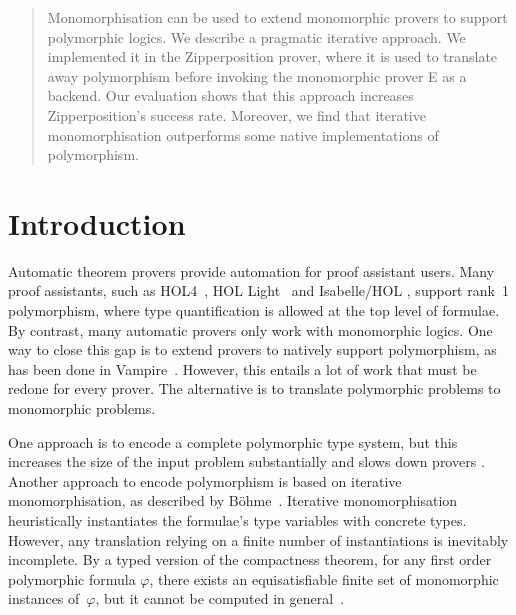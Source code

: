 \documentclass[runningheads]{llncs}
\begin{document}
\author{Tanguy Bozec\textsuperscript{\CORR} \and
Jasmin Blanchette}




\maketitle

\begin{sloppy}
\begin{abstract}
Monomorphisation can be used to extend monomorphic provers to support polymorphic logics. We describe a pragmatic iterative approach. We implemented it in the Zipperposition prover, where it is used to translate away polymorphism before invoking the monomorphic prover E as a backend. Our evaluation shows that this approach increases Zipperposition's success rate. Moreover, we find that iterative monomorphisation outperforms some native implementations of polymorphism.

\end{abstract}
\end{sloppy}

\section{Introduction}

Automatic theorem provers provide automation for proof assistant users. Many proof assistants, such as HOL4~\cite{slind-norrish-2008}, HOL Light~\cite{harrison-2009} and Isabelle\slash HOL \cite{nipkow-et-al-2002}, support rank~1 polymorphism, where type quantification is allowed at the top level of formulae. By contrast, many automatic provers only work with monomorphic logics. One way to close this gap is to extend provers to natively support polymorphism, as has been done in Vampire~\cite{bhayat-reger-2020}. However, this entails a lot of work that must be redone for every prover.
%
The alternative is to translate polymorphic problems to monomorphic problems.

One approach \cite{mono-trans} is to encode a complete polymorphic type system, %
but this increases the size of the input problem substantially and slows down provers \cite{mono-trans}.
%
Another approach to encode polymorphism is based on {iterative monomorphisation}, as described by B\"ohme~\cite[Section 2.2.1]{sb-phd}.
%
Iterative monomorphisation heuristically instantiates the formulae's type variables with concrete types.
%
However, any translation relying on a finite number of instantiations is inevitably incomplete.
By a typed version of the compactness theorem, for any first order polymorphic formula \(\varphi\), there exists an equisatisfiable finite set of monomorphic instances of~\(\varphi\), but
it cannot be computed in general~\cite[Theorem~1]{expr-poly-types}.
\end{document}
